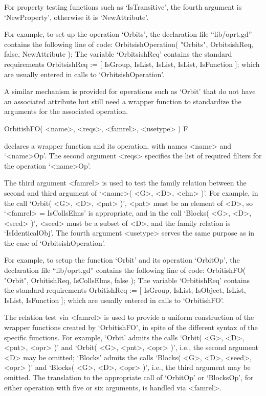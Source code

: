 For property testing functions such as `IsTransitive',
the fourth argument is `NewProperty',
otherwise it is `NewAttribute'.

For example, to set up the operation `Orbits',
the declaration file ``lib/oprt.gd'' contains the following line of code:
\begintt
OrbitsishOperation( "Orbits", OrbitsishReq, false, NewAttribute );
\endtt
The variable `OrbitsishReq' contains the standard requirements
\begintt
OrbitsishReq := [ IsGroup, IsList,
		  IsList,
		  IsList,
		  IsFunction ];
\endtt
which are usually entered in calls to `OrbitsishOperation'.

A similar mechanism is provided for operations such as `Orbit' that do
not have an associated attribute but still need a wrapper function to
standardize the arguments for the associated operation.

\>OrbitishFO( <name>, <reqs>, <famrel>, <usetype> ) F

declares a wrapper function and its operation,
with names <name> and `<name>Op'.
The second argument <reqs> specifies the list of required filters for the
operation `<name>Op'.

The third argument <famrel>  is used to  test the family relation between
the  second  and third  argument of `<name>( <G>, <D>, <elm> )'.
For example, in the call `Orbit( <G>, <D>, <pnt> )',
<pnt> must be an element of <D>, so `<famrel> = IsCollsElms' is
appropriate, and in the call `Blocks( <G>, <D>, <seed> )',
<seed> must be a subset of <D>,
and the family relation is `IsIdenticalObj'.
The fourth argument <usetype> serves the  same purpose as  in the case of
`OrbitsishOperation'.

For example, to setup the function `Orbit' and its operation `OrbitOp',
the declaration file ``lib/oprt.gd'' contains the following line of code:
\begintt
OrbitishFO( "Orbit", OrbitishReq, IsCollsElms, false );
\endtt
The variable `OrbitishReq' contains the standard requirements
\begintt
OrbitishReq  := [ IsGroup, IsList, IsObject,
		  IsList,
		  IsList,
		  IsFunction ];
\endtt
which are usually entered in calls to `OrbitishFO'.

The relation test via <famrel> is used to provide a uniform construction
of the wrapper functions created by `OrbitishFO',
in spite of the different syntax of the specific functions.
For example, `Orbit' admits the calls `Orbit( <G>, <D>, <pnt>, <opr> )'
and `Orbit( <G>, <pnt>, <opr> )', i.e., the second argument <D> may be
omitted;
`Blocks' admits the calls `Blocks( <G>, <D>, <seed>, <opr> )' and
`Blocks( <G>, <D>, <opr> )', i.e., the third argument may be omitted.
The translation to the appropriate call of `OrbitOp' or `BlocksOp',
for either operation with five or six arguments, 
is handled via <famrel>.


